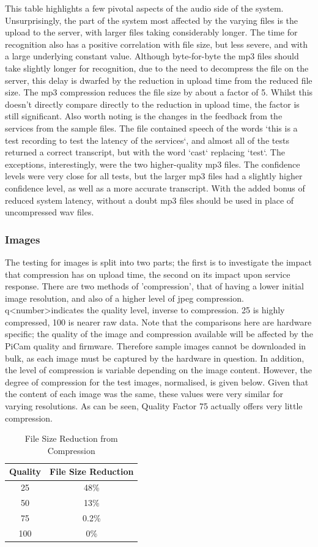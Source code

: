 \documentclass{article}
\begin{document}
This table highlights a few pivotal aspects of the audio side of the system. Unsurprisingly, the part of the system most affected by the varying files is the upload to the server, with larger files taking considerably longer. The time for recognition also has a positive correlation with file size, but less severe, and with a large underlying constant value. Although byte-for-byte the mp3 files should take slightly longer for recognition, due to the need to decompress the file on the server, this delay is dwarfed by the reduction in upload time from the reduced file size. The mp3 compression reduces the file size by about a factor of 5. Whilst this doesn't directly compare directly to the reduction in upload time, the factor is still significant. Also worth noting is the changes in the feedback from the services from the sample files. The file contained speech of the words `this is a test recording to test the latency of the services`, and almost all of the tests returned a correct transcript, but with the word `cast` replacing `test`. The exceptions, interestingly, were the two higher-quality mp3 files. The confidence levels were very close for all tests, but the larger mp3 files had a slightly higher confidence level, as well as a more accurate transcript. With the added bonus of reduced system latency, without a doubt mp3 files should be used in place of uncompressed wav files.

\subsubsection{Images}
The testing for images is split into two parts; the first is to investigate the impact that compression has on upload time, the second on its impact upon service response. There are two methods of 'compression', that of having a lower initial image resolution, and also of a higher level of jpeg compression. q\textless number\textgreater indicates the quality level, inverse to compression. 25 is highly compressed, 100 is nearer raw data. Note that the comparisons here are hardware specific; the quality of the image and compression available will be affected by the PiCam quality and firmware. Therefore sample images cannot be downloaded in bulk, as each image must be captured by the hardware in question. In addition, the level of compression is variable depending on the image content. However, the degree of compression for the test images, normalised, is given below. Given that the content of each image was the same, these values were very similar for varying resolutions. As can be seen, Quality Factor 75 actually offers very little compression. 
\begin{table}[h]
\caption{File Size Reduction from Compression}
\centering
\begin{tabular}{| c | c |}
\hline
Quality & File Size Reduction\\ \hline
25 & 48\% \\ \hline
50 & 13\% \\ \hline
75 & 0.2\% \\ \hline
100 & 0\% \\ \hline
\end{tabular}
\end{table}
\end{document}
